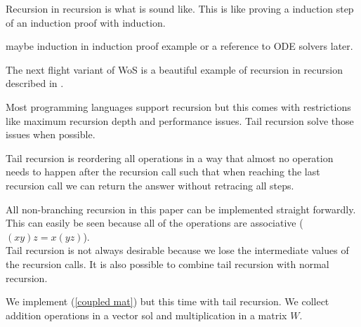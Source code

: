 \documentclass[a4paper,12pt]{article}
\begin{document}
\begin{pythonn} 
\end{pythonn}

\begin{technique}
    Recursion in recursion is what is sound like. This is like proving a induction
    step of an induction proof with induction. \end{technique}

\begin{example}
    maybe induction in induction proof example or a reference to ODE solvers later.
\end{example}

\begin{related}
    The next flight variant of WoS
    is a beautiful example of recursion in recursion described in
    \cite{sawhney_grid-free_2022}.
\end{related}

Most programming languages support recursion but this comes with restrictions
like maximum recursion depth and performance issues. Tail recursion solve those
issues when possible.

\begin{technique}
    Tail recursion is reordering all operations in a way that
    almost no operation needs to happen after the recursion call such that when reaching
    the last recursion call we can return the answer without retracing all steps.
\end{technique}

All non-branching recursion
in this paper can be implemented straight forwardly. This can easily be seen because
all of the operations are associative ($(xy)z = x(yz)$). \\
Tail recursion is not always desirable because we lose the intermediate values of the
recursion calls. It is also possible to combine tail recursion with normal recursion.

\begin{pythonn}
    We implement (\ref{coupled mat}) but this time with tail recursion.
    We collect addition operations in a vector sol and multiplication
    in a matrix $W$.
    \vspace{0.3cm}
\end{pythonn}
\end{document}
